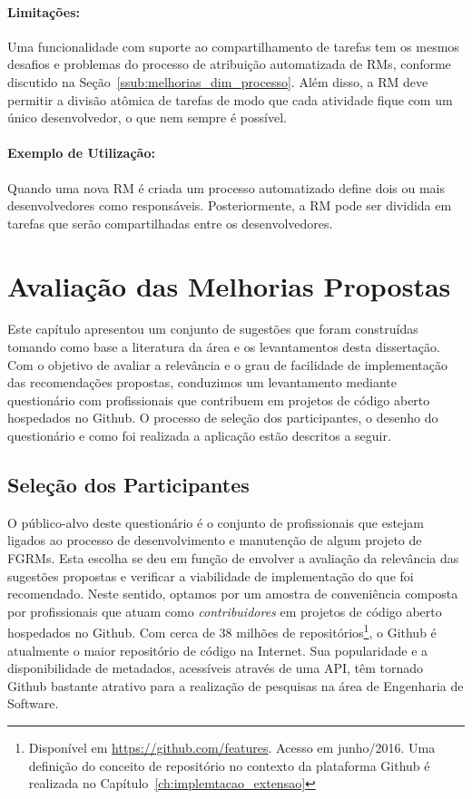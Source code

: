 \paragraph{Limitações:}
\label{par:limitacoes_s08}

Uma funcionalidade com suporte ao compartilhamento de tarefas tem os mesmos
desafios e problemas do processo de atribuição automatizada de RMs, conforme
discutido na Seção~\ref{ssub:melhorias_dim_processo}. Além disso, a RM deve
permitir a divisão atômica de tarefas de modo que cada atividade fique com um
único desenvolvedor, o que nem sempre é possível.

\paragraph{Exemplo de Utilização:}
\label{par:exemplo_de_utilização_s08}

Quando uma nova RM é criada um processo automatizado define dois ou mais
desenvolvedores como responsáveis. Posteriormente, a RM pode ser dividida em
tarefas que serão compartilhadas entre os desenvolvedores.

\section{Avaliação das Melhorias Propostas}
\label{sec:sug_melhoria_avaliacao_das_melhorias}

Este capítulo apresentou um conjunto de sugestões que foram construídas tomando
como base a literatura da área e os levantamentos desta dissertação. Com o
objetivo de avaliar a relevância e o grau de facilidade de implementação das
recomendações propostas, conduzimos um levantamento mediante questionário com
profissionais que contribuem em projetos de código aberto hospedados no Github.
O processo de seleção dos participantes, o desenho do questionário e como foi
realizada a aplicação estão descritos a seguir.

\subsection{Seleção dos Participantes}
\label{ssub:sug_melhoria_selecao_participantes}

O público-alvo deste questionário é o conjunto de profissionais que estejam
ligados ao processo de desenvolvimento e manutenção de algum projeto de FGRMs.
Esta escolha se deu em função de envolver a avaliação da relevância das
sugestões propostas e verificar a viabilidade de implementação do que foi
recomendado. Neste sentido, optamos por um amostra de conveniência composta por
profissionais que atuam como \textit{contribuidores} em projetos de código
aberto hospedados no Github. Com cerca de 38 milhões de
repositórios\footnote{Disponível em \url{https://github.com/features}. Acesso em
    junho/2016. Uma definição do conceito de repositório no contexto da
    plataforma Github é realizada no Capítulo~\ref{ch:implemtacao_extensao}}, o
Github é atualmente o maior repositório de código na Internet. Sua popularidade
e a disponibilidade de metadados, acessíveis através de uma API, têm tornado
Github bastante atrativo para a realização de pesquisas na área de Engenharia de
Software.

